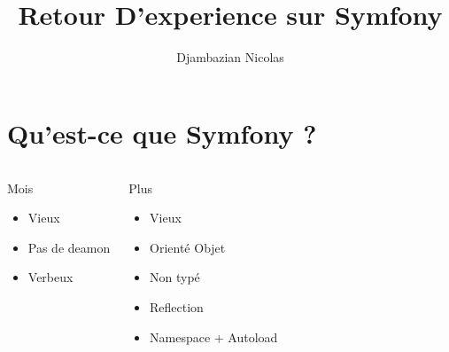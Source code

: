 \documentclass[12pt, francais]{beamer}
\title{Retour D'experience sur Symfony}
\date{}
\author{Djambazian Nicolas}
\begin{document}
\maketitle

\section{Qu'est-ce que Symfony ?}

\begin{frame}
	\pause
	\begin{columns}
			\begin{block}{Mois}
				\begin{itemize}
					\centering
					\item  Vieux \\
					\item Pas de deamon \\
					\item Verbeux \\
				\end{itemize}
			\end{block}
		\column[c]{.4\linewidth}
			\begin{block}{Plus}
				\begin{itemize}
					\centering
					\item Vieux \\
					\item Orient\'e Objet \\
					\item Non typ\'e \\
					\item Reflection \\
					\item Namespace + Autoload \\
				\end{itemize}
			\end{block}
	\end{columns}
\end{frame}
\end{document}
